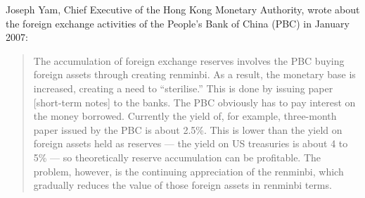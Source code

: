 \documentclass[letterpaper,12pt]{exam}
\begin{document}
\begin{questions}
Joseph Yam, Chief Executive of the Hong Kong Monetary Authority, wrote about the foreign exchange activities of the People's Bank of China (PBC) in January 2007:
%
\begin{quote}
The accumulation of foreign exchange reserves
involves the PBC buying foreign assets through creating renminbi.
As a result, the monetary base is increased, creating a need to ``sterilise.''
This is done by issuing paper [short-term notes] to the banks.
The PBC obviously has to pay interest on the money borrowed.
Currently the yield of, for example, three-month paper issued by the PBC is about 2.5\%.
This is lower than the yield on foreign assets held as reserves ---
the yield on US treasuries is about 4 to 5\% --- so theoretically
reserve accumulation can be profitable.
The problem, however, is the continuing appreciation of the renminbi,
which gradually reduces the value of those foreign assets in renminbi terms.
\end{quote}


\begin{solution}
\begin{parts}

\end{parts}
\end{solution}
\end{questions}
\end{document}
